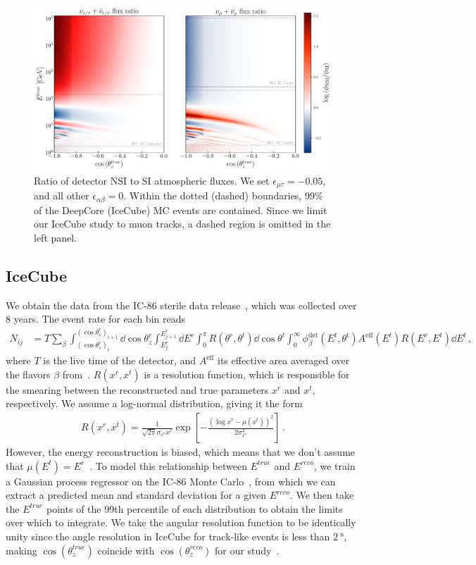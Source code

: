 \documentclass[draft=True]{revtex4-2}
\newcommand{\zreco}{\ensuremath{\cos{(\theta_z^{reco})}}}
\newcommand{\ztrue}{\ensuremath{\cos{(\theta_z^{true})}}}
\newcommand{\emt}{\ensuremath{\epsilon_{\mu\tau}}}
\newcommand{\Ereco}{E^{reco}}
\newcommand{\Etrue}{E^{true}}
\begin{document}
\begin{figure}[!tb]
   \begin{center}
      \includegraphics[width=0.8\linewidth]{figures/flux_ratio.pdf}
   \end{center}
   \caption{Ratio of detector NSI to SI atmospheric fluxes. We set $\emt = -0.05$, and all other $\epsilon_{\alpha\beta}=0$. 
   Within the dotted (dashed) boundaries, 99\% of the  DeepCore (IceCube) MC events are contained. Since we limit our IceCube study to muon tracks,
   a dashed region is omitted in the left panel.}\label{fig:flux_ratio}
\end{figure}%

\subsection{IceCube}\label{ch:ICmethod}
We obtain the data from the IC-86 sterile data release~\cite{IC2020}, which was collected over 8 years. The event rate for each bin reads
\begin{align}\label{eq:ICevents}
   N_{ij} &= T\sum_\beta \int_{(\cos{\theta_z^r})_i}^{(\cos{\theta_z^r})_{i+1}} \dd \cos{\theta^r_z} \int_{E^r_{j}}^{E^r_{j+1}} \dd E^r \int_0^\pi R(\theta^r,\theta^t) \dd \cos{\theta^t} \int_0^\infty \phi_\beta^\text{det}(E^t,\theta^t)  A^\text{eff}(E^t) R(E^r,E^t) 
   \dd E^t\,,
\end{align}
where $T$ is the live time of the detector, and $A^\text{eff}$ its effective area averaged over the flavors $\beta$ from~\cite{ICaeff}. $R(x^r,x^t)$ is a resolution function, 
which is responsible for the smearing between the reconstructed and true parameters $x^r$ and $x^t$, respectively. We assume a log-normal distribution, giving it the form 
\begin{align}
    R(x^r, x^t) = \frac{1}{\sqrt{2\pi} \sigma_{x^r}x^r} \exp\left[-\frac{(\log x^r-\mu(x^t))^2}{2\sigma_{x^r}^2}\right]\,.
\end{align}
However, the energy reconstruction is biased, which means that we don't assume that $\mu(E^t) =E^r$~\cite{weaverEvidenceAstrophysicalMuon}. 
To model this relationship between $\Etrue$ and $\Ereco$, we train a Gaussian process regressor on the IC-86 Monte Carlo~\cite{IC2016}, from which
we can extract a predicted mean and standard deviation for a given $E^{reco}$. We then take the $\Etrue$ points of the 99th percentile of each distribution to obtain
the limits over which to integrate. We take the angular resolution function to be identically unity since the angle resolution in IceCube for track-like 
events is less than $\SI{2}{\degree}$, making $\ztrue$ coincide with $\zreco$ for our study~\cite{IC2020}. 
\end{document}
